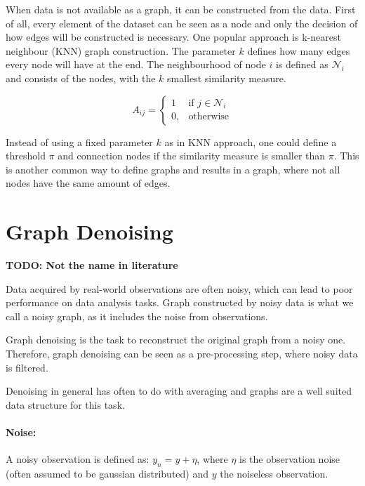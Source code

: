 \label{sec:graphConstruction}
When data is not available as a graph, it can be constructed from the data.
First of all, every element of the dataset can be seen as a node and only the decision of how edges will be constructed
is necessary. One popular approach is k-nearest neighbour (KNN) graph construction. The parameter $k$
defines how many edges every node will have at the end. The neighbourhood of node $i$ is defined
as $\mathcal{N}_i$ and consists of the nodes, with the $k$ smallest similarity measure.

\begin{equation}
    \label{eg:knn}
    A_{ij} =    
    \begin{cases}
        1  & \text{if } j \in \mathcal{N}_i \\
        0, & \text{otherwise}
    \end{cases}
\end{equation}

Instead of using a fixed parameter $k$ as in KNN approach, one could define a threshold $\pi$
and connection nodes if the similarity measure is smaller than $\pi$. This is another common way
to define graphs and results in a graph, where not all nodes have the same amount of edges.

\section{Graph Denoising}
\textbf{TODO: Not the name in literature}

Data acquired by real-world observations are often noisy, which can lead to poor 
performance on data analysis tasks. Graph constructed by noisy data is what we call
a noisy graph, as it includes the noise from observations.

Graph denoising is the task to reconstruct the original graph from a noisy one.
Therefore, graph denoising can be seen as a pre-processing step, where noisy data is filtered.

Denoising in general has often to do with averaging 
 and graphs are a well suited data structure for this task\cite{noneLocalMean}.

\paragraph{Noise:}
A noisy observation is defined as:
$y_n = y + \eta$, where $\eta$ is the observation noise (often assumed to be gaussian distributed)
and $y$ the noiseless observation.

